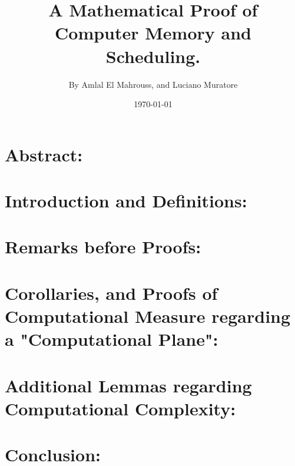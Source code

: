 \documentclass[10pt]{article}
\title{%
	\vspace{-1.5em}%
	\large\textbf{A Mathematical Proof of Computer Memory and Scheduling.}%
}
\author{By Amlal El Mahrouss, and Luciano Muratore}
\date{\today}
\theoremstyle{plain}
\theoremstyle{definition}
\theoremstyle{remark}
\begin{document}
	
	\maketitle
	\tableofcontents
	\newpage

\section{Abstract:}
	
\section{Introduction and Definitions:}

\section{Remarks before Proofs:}

\section{Corollaries, and Proofs of Computational Measure regarding a "Computational Plane":}

\section{Additional Lemmas regarding Computational Complexity:}

\section{Conclusion:}

\nocite{*}


\end{document}
